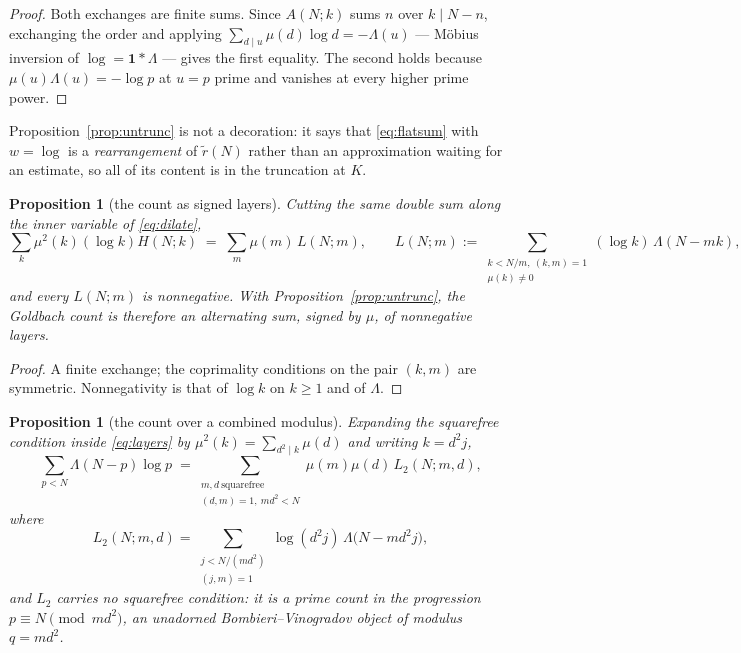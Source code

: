 \documentclass[11pt,a4paper]{article}
\theoremstyle{plain}
\newtheorem{proposition}[theorem]{Proposition}
\theoremstyle{definition}
\theoremstyle{remark}
\begin{document}
\begin{proof}
Both exchanges are finite sums. Since $A(N;k)$ sums $n$ over
$k\mid N-n$, exchanging the order and applying
$\sum_{d\mid u}\mu(d)\log d=-\Lambda(u)$ --- M\"obius inversion of
$\log=\mathbf 1*\Lambda$ --- gives the first equality. The second
holds because $\mu(u)\Lambda(u)=-\log p$ at $u=p$ prime and vanishes
at every higher prime power.
\end{proof}

Proposition~\ref{prop:untrunc} is not a decoration: it says that
\eqref{eq:flatsum} with $w=\log$ is a \emph{rearrangement} of
$\tilde r(N)$ rather than an approximation waiting for an estimate,
so all of its content is in the truncation at $K$.

\begin{proposition}[the count as signed layers]\label{prop:layers}
Cutting the same double sum along the inner variable of
\eqref{eq:dilate},
\begin{equation}\label{eq:layers}
  \sum_{k}\mu^2(k)(\log k)H(N;k)\;=\;\sum_{m}\mu(m)\,L(N;m),
  \qquad
  L(N;m):=\!\!\sum_{\substack{k<N/m,\ (k,m)=1\\ \mu(k)\neq0}}\!\!
            (\log k)\,\Lambda(N-mk),
\end{equation}
and every $L(N;m)$ is nonnegative. With
Proposition~\ref{prop:untrunc}, the Goldbach count is therefore an
alternating sum, signed by $\mu$, of nonnegative layers.
\end{proposition}

\begin{proof}
A finite exchange; the coprimality conditions on the pair $(k,m)$ are
symmetric. Nonnegativity is that of $\log k$ on $k\ge1$ and of
$\Lambda$.
\end{proof}

\begin{proposition}[the count over a combined modulus]%
\label{prop:combined}
Expanding the squarefree condition inside \eqref{eq:layers} by
$\mu^2(k)=\sum_{d^2\mid k}\mu(d)$ and writing $k=d^2j$,
\begin{equation}\label{eq:combined}
  \sum_{p<N}\Lambda(N-p)\log p
   \;=\!\!\sum_{\substack{m,d\ \text{squarefree}\\ (d,m)=1,\ md^2<N}}\!\!
     \mu(m)\mu(d)\,L_2(N;m,d),
\end{equation}
where
\[
  L_2(N;m,d)=\!\!\sum_{\substack{j<N/(md^2)\\ (j,m)=1}}\!\!
   \log(d^2j)\,\Lambda\bigl(N-md^2j\bigr),
\]
and $L_2$ carries no squarefree condition: it is a prime count in the
progression $p\equiv N\pmod{md^2}$, an unadorned
Bombieri--Vinogradov object of modulus $q=md^2$.
\end{proposition}
\end{document}
